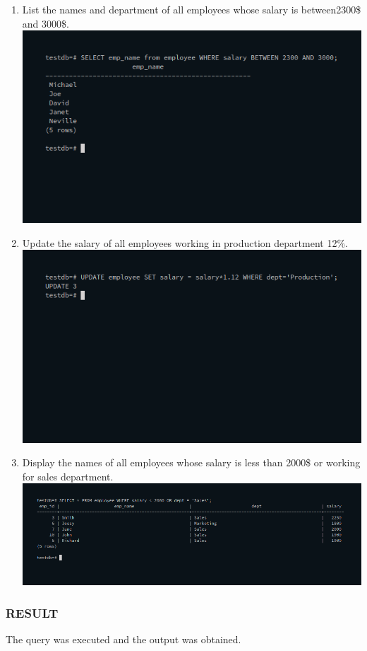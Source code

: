 \documentclass[10pt,a4paper,titlepage]{report}
\begin{document}
{\begin{enumerate}
		\item List the names and department of all employees whose salary is between2300\$ and 3000\$.\newline
			\includegraphics[width=\linewidth]{../Images/Basics/10.png}\newline
		\item Update the salary of all employees working in production department 12\%.\newline
			\includegraphics[width=\linewidth]{../Images/Basics/11.png}\newline
		\item Display the names of all employees whose salary is less than 2000\$ or working for sales department.\newline
			\includegraphics[width=\linewidth]{../Images/Basics/12.png}\newline
\end{enumerate}

\subsubsection*{RESULT}

The query was executed and the output was obtained.


}
\end{document}
